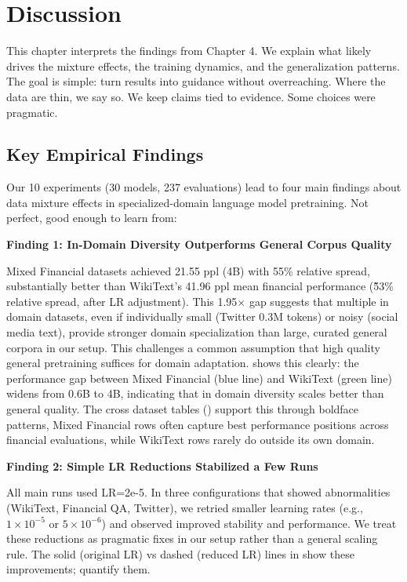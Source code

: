 \chapter{Discussion}

This chapter interprets the findings from Chapter 4. We explain what likely drives the mixture effects, the training dynamics, and the generalization patterns. The goal is simple: turn results into guidance without overreaching. Where the data are thin, we say so. We keep claims tied to evidence. Some choices were pragmatic.

\section{Key Empirical Findings}

Our 10 experiments (30 models, 237 evaluations) lead to four main findings about data mixture effects in specialized-domain language model pretraining. Not perfect, good enough to learn from:

\textbf{Finding 1: In-Domain Diversity Outperforms General Corpus Quality}

Mixed Financial datasets achieved 21.55 ppl (4B) with 55\% relative spread, substantially better than WikiText's 41.96 ppl mean financial performance (\~53\% relative spread, after LR adjustment). This 1.95$\times$ gap suggests that multiple in domain datasets, even if individually small (Twitter 0.3M tokens) or noisy (social media text), provide stronger domain specialization than large, curated general corpora in our setup. This challenges a common assumption that high quality general pretraining suffices for domain adaptation.  shows this clearly: the performance gap between Mixed Financial (blue line) and WikiText (green line) widens from 0.6B to 4B, indicating that in domain diversity scales better than general quality. The cross dataset tables () support this through boldface patterns, Mixed Financial rows often capture best performance positions across financial evaluations, while WikiText rows rarely do outside its own domain.

\textbf{Finding 2: Simple LR Reductions Stabilized a Few Runs}

All main runs used LR=2e-5. In three configurations that showed abnormalities (WikiText, Financial QA, Twitter), we retried smaller learning rates (e.g., $1\times10^{-5}$ or $5\times10^{-6}$) and observed improved stability and performance. We treat these reductions as pragmatic fixes in our setup rather than a general scaling rule. The solid (original LR) vs dashed (reduced LR) lines in  show these improvements;  quantify them.


